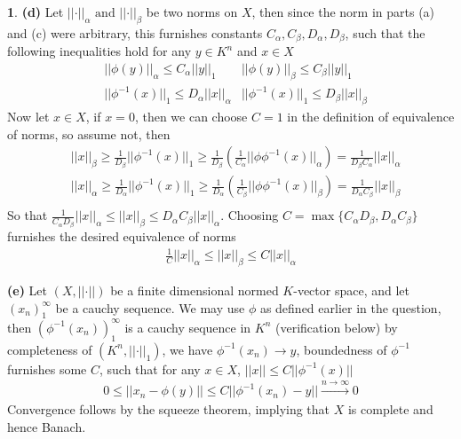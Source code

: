 \documentclass[10.5pt]{article}
\theoremstyle{definition}
\newtheorem{pb}{}
\newcommand{\set}[1]{\{#1\}}
\newcommand{\norm}[1]{\lvert\lvert#1\rvert\rvert}
\newcommand{\tand}{\text{ and }}
\begin{document}
\begin{pb}
        \textbf{(d)} Let \(\norm{\cdot}_\alpha \tand \norm{\cdot}_\beta\) be two norms on \(X\), then since the norm in parts (a) and (c) were arbitrary, this furnishes constants \(C_\alpha, C_\beta, D_\alpha, D_\beta\), such that the following inequalities hold for any \(y \in K^n\) and \(x \in X\)
        \begin{align*}
            &\norm{\phi(y)}_\alpha \leq C_\alpha\norm{y}_1
            &\norm{\phi(y)}_\beta \leq C_\beta\norm{y}_1\\
            &\norm{\phi^{-1}(x)}_1 \leq D_\alpha\norm{x}_\alpha
            &\norm{\phi^{-1}(x)}_1 \leq D_\beta\norm{x}_\beta
        \end{align*}
        Now let \(x \in X\), if \(x = 0\), then we can choose \(C = 1\) in the definition of equivalence of norms, so assume not, then
        \begin{align*}
            &\norm{x}_\beta \geq \frac{1}{D_\beta}\norm{\phi^{-1}(x)}_1 \geq \frac{1}{D_\beta}\left(\frac{1}{C_\alpha}\norm{\phi\phi^{-1}(x)}_\alpha\right) = \frac{1}{D_\beta C_\alpha}\norm{x}_\alpha \\
            &\norm{x}_\alpha \geq \frac{1}{D_\alpha}\norm{\phi^{-1}(x)}_1 \geq \frac{1}{D_\alpha}\left(\frac{1}{C_\beta}\norm{\phi\phi^{-1}(x)}_\beta\right) = \frac{1}{D_\alpha C_\beta}\norm{x}_\beta \\
        \end{align*}
        So that \(\frac{1}{C_\alpha D_\beta}\norm{x}_\alpha \leq \norm{x}_\beta \leq D_\alpha C_\beta\norm{x}_\alpha\).
        Choosing \(C = \max\set{C_\alpha D_\beta, D_\alpha C_\beta}\) furnishes the desired equivalence of norms
        \begin{align*}
            \frac{1}{C}\norm{x}_\alpha \leq \norm{x}_\beta \leq C\norm{x}_\alpha
        \end{align*}

        \textbf{(e)} Let \((X,\norm{\cdot})\) be a finite dimensional normed \(K\)-vector space, and let \((x_n)_1^\infty\) be a cauchy sequence. We may use \(\phi\) as defined earlier in the question, then \((\phi^{-1}(x_n))_1^\infty\) is a cauchy sequence in \(K^n\) (verification below) by completeness of \((K^n,\norm{\cdot}_1)\), we have \(\phi^{-1}(x_n) \to y\), boundedness of \(\phi^{-1}\) furnishes some \(C\), such that for any \(x \in X\), \(\norm{x} \leq C\norm{\phi^{-1}(x)}\)
        \begin{align*}
            0 \leq \norm{x_n - \phi(y)} \leq C\norm{\phi^{-1}(x_n) - y} \overset{n \to \infty}{\longrightarrow} 0
        \end{align*}
        Convergence follows by the squeeze theorem, implying that \(X\) is complete and hence Banach.


\end{pb}
\end{document}
